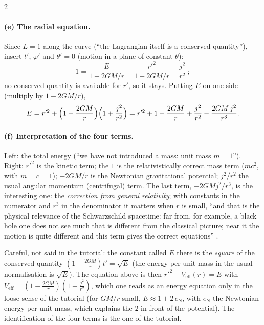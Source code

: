 \begin{paracol}{2}
\paragraph{(e) The radial equation.} Since $L=1$ along the curve (``the Lagrangian itself is a conserved quantity''), insert $t'$, $\varphi'$ and $\theta'=0$ (motion in a plane of constant $\theta$):
\[
  1=\frac{E}{1-2GM/r}-\frac{r'^2}{1-2GM/r}-\frac{j^2}{r^2}\ ;
\]
no conserved quantity is available for $r'$, so it stays. Putting $E$ on one side (multiply by $1-2GM/r$),
\[
  E=r'^2+\Bigl(1-\frac{2GM}{r}\Bigr)\Bigl(1+\frac{j^2}{r^2}\Bigr)=r'^2+1-\frac{2GM}{r}+\frac{j^2}{r^2}-\frac{2GM\,j^2}{r^3}.
\]

\paragraph{(f) Interpretation of the four terms.} Left: the total energy (``we have not introduced a mass: unit mass $m=1$''). Right: $r'^2$ is the kinetic term; the $1$ is the relativistically correct mass term ($mc^2$, with $m=c=1$); $-2GM/r$ is the Newtonian gravitational potential; $j^2/r^2$ the usual angular momentum (centrifugal) term. The last term, $-2GMj^2/r^3$, is the interesting one: the \emph{correction from general relativity}; with constants in the numerator and $r^3$ in the denominator it matters when $r$ is small, ``and that is the physical relevance of the Schwarzschild spacetime: far from, for example, a black hole one does not see much that is different from the classical picture; near it the motion is quite different and this term gives the correct equations'' .
\begin{coursenote}
Careful, not said in the tutorial: the constant called $E$ there is the \emph{square} of the conserved quantity $(1-\frac{2GM}r)t'=\sqrt E$ (the energy per unit mass in the usual normalisation is $\sqrt E$). The equation above is then $r'^2+V_{\mathrm{eff}}(r)=E$ with $V_{\mathrm{eff}}=(1-\frac{2GM}r)(1+\frac{j^2}{r^2})$, which one reads as an energy equation only in the loose sense of the tutorial (for $GM/r$ small, $E\approx1+2\,e_{\mathrm N}$, with $e_{\mathrm N}$ the Newtonian energy per unit mass, which explains the $2$ in front of the potential). The identification of the four terms is the one of the tutorial.
\end{coursenote}


\end{paracol}
